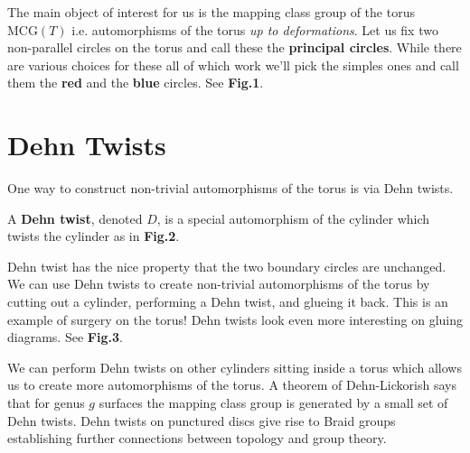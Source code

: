 The main object of interest for us is the mapping class group of the torus $\mathrm{MCG}(T)$ i.e. automorphisms of the torus \emph{up to deformations}. Let us fix two non-parallel circles on the torus and call these the \textbf{principal circles}. While there are various choices for these all of which work we'll pick the simples ones and call them the \textbf{red} and the \textbf{blue} circles. See \textbf{Fig.1}.
%
%
%


\section{Dehn Twists}
One way to construct non-trivial automorphisms of the torus is via Dehn twists.
\begin{definition}
	A \textbf{Dehn twist}, denoted $D$, is a special automorphism of the cylinder which twists the cylinder as in \textbf{Fig.2}.
\end{definition}


Dehn twist has the nice property that the two boundary circles are unchanged. We can use Dehn twists to create  non-trivial automorphisms of the torus by cutting out a cylinder, performing a Dehn twist, and glueing it back. This is an example of surgery on the torus! Dehn twists look even more interesting on gluing diagrams. See \textbf{Fig.3}.

We can perform Dehn twists on other cylinders sitting inside a torus which allows us to create more automorphisms of the torus. A theorem of Dehn-Lickorish  says that for genus $g$ surfaces the mapping class group is generated by a small set of Dehn twists. Dehn twists on punctured discs give rise to Braid groups establishing further connections between topology and group theory.


